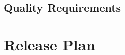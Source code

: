 \documentclass[10pt,a4paper]{article}
\begin{document}
\subsection{Quality Requirements}











\section{Release Plan}
\end{document}
